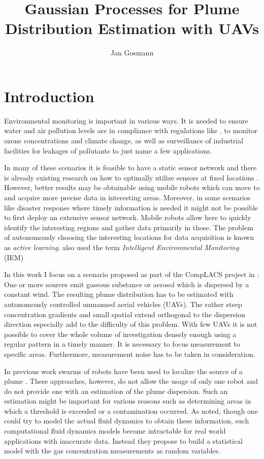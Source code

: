 \documentclass[11pt,a4paper]{scrreprt}
\title{Gaussian Processes for Plume Distribution Estimation with UAVs}
\author{Jan Gosmann}
\newcommand{\newterm}[1]{\emph{#1}}
\begin{document}
\maketitle
\tableofcontents

\chapter{Introduction}
Environmental monitoring is important in various ways. It is needed to ensure 
water and air pollution levels are in compliance with regulations like 
\textcite{Anonymous:1996ui}, to monitor ozone concentrations and climate change,  
as well as surveillance of industrial facilities for leakages of pollutants to 
just name a few applications.

In many of these scenarios it is feasible to have a static sensor network and 
there is already existing research on how to optimally utilize sensors at fixed 
locations \parencite[e.g.][]{Osborne:2008hi, Guestrin:2005cq, Wang:kz}.  
However, better results may be obtainable using mobile robots which can move to 
and acquire more precise data in interesting areas. Moreover, in some scenarios 
like disaster response where timely information is needed it might not be 
possible to first deploy an extensive sensor network. Mobile robots allow here 
to quickly identify the interesting regions and gather data primarily in those.  
The problem of autonomously choosing the interesting locations for data 
acquisition is known as \newterm{active learning}. \textcite{Marchant:2012wb} 
also used the term \newterm{Intelligent Environmental Monitoring} (IEM) 

In this work I focus on a scenario proposed as part of the CompLACS project in 
\textcite{denardi2013rn}: One or more sources emit gaseous substance or aerosol 
which is dispersed by a constant wind. The resulting plume distribution has to 
be estimated with autonomously controlled unmanned aerial vehicles (UAVs). The 
rather steep concentration gradients and small spatial extend orthogonal to the 
dispersion direction especially add to the difficulty of this problem.  With few 
UAVs it is not possible to cover the whole volume of investigation densely 
enough using a regular pattern in a timely manner. It is necessary to focus 
measurement to specific areas. Furthermore, measurement noise has to be taken in 
consideration.

In previous work swarms of robots have been used to localize the source of 
a plume \parencite{Jatmiko:2007df, Zarzhitsky:2005tz}. These approaches, 
however, do not allow the usage of only one robot and do not provide one with an 
estimation of the plume dispersion. Such an estimation might be important for 
various reasons such as determining areas in which a threshold is exceeded or 
a contamination occurred. As \textcite{Reggente:2009ti} noted, though one could 
try to model the actual fluid dynamics to obtain these information, such 
computational fluid dynamics models become intractable for real world 
applications with inaccurate data.  Instead they propose to build a statistical 
model with the gas concentration measurements as random variables.
\end{document}
